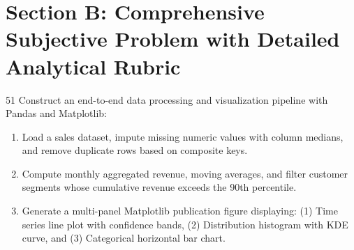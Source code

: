 \newpage
\section{Section B: Comprehensive Subjective Problem with Detailed Analytical Rubric}

\begin{subjectiveq}{5}{1}
Construct an end-to-end data processing and visualization pipeline with Pandas and Matplotlib:
\begin{enumerate}[label=(\alph*)]
    \item Load a sales dataset, impute missing numeric values with column medians, and remove duplicate rows based on composite keys.
    \item Compute monthly aggregated revenue, moving averages, and filter customer segments whose cumulative revenue exceeds the 90th percentile.
    \item Generate a multi-panel Matplotlib publication figure displaying: (1) Time series line plot with confidence bands, (2) Distribution histogram with KDE curve, and (3) Categorical horizontal bar chart.
\end{enumerate}
\end{subjectiveq}


